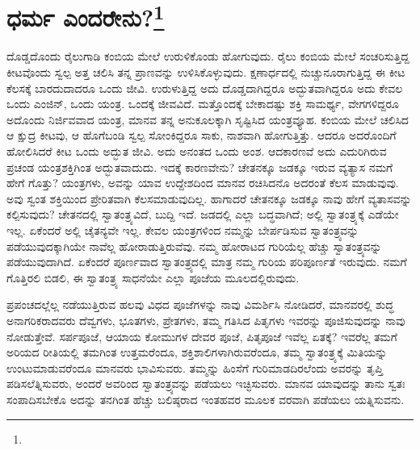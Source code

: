 
\chapter[ಧರ್ಮ ಎಂದರೇನು?]{ಧರ್ಮ ಎಂದರೇನು?\protect\footnote{}}

ದೊಡ್ಡದೊಂದು ರೈಲುಗಾಡಿ ಕಂಬಿಯ ಮೇಲೆ ಉರುಳಿಕೊಂಡು ಹೋಗುವುದು. ರೈಲು ಕಂಬಿಯ ಮೇಲೆ ಸಂಚರಿಸುತ್ತಿದ್ದ ಕೀಟವೊಂದು ಸ್ವಲ್ಪ ಅತ್ತ ಚಲಿಸಿ ತನ್ನ ಪ್ರಾಣವನ್ನು ಉಳಿಸಿಕೊಳ್ಳುವುದು. ಕ್ಷಣಾರ್ಧದಲ್ಲಿ ನುಚ್ಚುನೂರಾಗುತ್ತಿದ್ದ ಈ ಕೀಟ ಕೆಲಸಕ್ಕೆ ಬಾರದುದಾದರೂ ಒಂದು ಜೀವಿ. ಉರುಳುತ್ತಿದ್ದ ಅದು ದೊಡ್ಡದಾಗಿದ್ದರೂ ಅದ್ಭುತವಾಗಿದ್ದರೂ ಅದು ಕೇವಲ ಒಂದು ಎಂಜಿನ್, ಒಂದು ಯಂತ್ರ. ಒಂದಕ್ಕೆ ಜೀವವಿದೆ. ಮತ್ತೊಂದಕ್ಕೆ ಬೇಕಾದಷ್ಟು ಶಕ್ತಿ ಸಾಮರ್ಥ್ಯ, ವೇಗಗಳಿದ್ದರೂ ಅದೊಂದು ನಿರ್ಜಿವವಾದ ಯಂತ್ರ, ಮಾನವ ತನ್ನ ಅನುಕೂಲಕ್ಕಾಗಿ ಸೃಷ್ಟಿಸಿದ ಯಂತ್ರವ್ಯೂಹ. ಕಂಬಿಯ ಮೇಲೆ ಚಲಿಸಿದ ಆ ಕ್ಷುದ್ರ ಕೀಟವು, ಆ ಹೊಗೆಬಂಡಿ ಸ್ವಲ್ಪ ಸೋಂಕಿದ್ದರೂ ಸಾಕು, ನಾಶವಾಗಿ ಹೋಗುತ್ತಿತ್ತು. ಆದರೂ ಅದರೊಂದಿಗೆ ಹೋಲಿಸಿದರೆ ಕೀಟ ಒಂದು ಅದ್ಭುತ ಜೀವಿ. ಅದು ಅನಂತದ ಒಂದು ಅಂಶ. ಆದಕಾರಣವೆ ಅದು ಎದುರಿಗಿರುವ ಪ್ರಚಂಡ ಯಂತ್ರಶಕ್ತಿಗಿಂತ ಅದ್ಭುತವಾದುದು. ಇದಕ್ಕೆ ಕಾರಣವೇನು? ಚೇತನಕ್ಕೂ ಜಡಕ್ಕೂ ಇರುವ ವ್ಯತ್ಯಾಸ ನಮಗೆ ಹೇಗೆ ಗೊತ್ತು? ಯಂತ್ರಗಳು, ಅವನ್ನು ಯಾವ ಉದ್ದೇಶದಿಂದ ಮಾನವ ರಚಿಸಿದನೊ ಅದರಂತೆ ಕೆಲಸ ಮಾಡುವುವು. ಅವು ಸ್ವಂತ ಶಕ್ತಿಯಿಂದ ಪ್ರೇರಿತವಾಗಿ ಕೆಲಸಮಾಡುವುದಿಲ್ಲ. ಹಾಗಾದರೆ ಚೇತನಕ್ಕೂ ಜಡಕ್ಕೂ ನಾವು ಹೇಗೆ ವ್ಯತಾಸವನ್ನು ಕಲ್ಪಿಸುವುದು? ಚೇತನದಲ್ಲಿ ಸ್ವಾತಂತ್ರ್ಯವಿದೆ, ಬುದ್ದಿ ಇದೆ. ಜಡದಲ್ಲಿ ಎಲ್ಲಾ ಬದ್ಧವಾಗಿದೆ; ಅಲ್ಲಿ ಸ್ವಾತಂತ್ರ್ಯಕ್ಕೆ ಎಡೆಯೇ ಇಲ್ಲ. ಏಕೆಂದರೆ ಅಲ್ಲಿ ಚೈತನ್ಯವೇ ಇಲ್ಲ. ಕೇವಲ ಯಂತ್ರಗಳಿಂದ ನಮ್ಮನ್ನು ಬೇರ್ಪಡಿಸುವ ಸ್ವಾತಂತ್ರ್ಯವನ್ನು ಪಡೆಯುವುದಕ್ಕಾಗಿಯೇ ನಾವೆಲ್ಲ ಹೋರಾಡುತ್ತಿರುವೆವು. ನಮ್ಮ ಹೋರಾಟದ ಗುರಿಯೆಲ್ಲ ಹೆಚ್ಚು ಸ್ವಾತಂತ್ರ್ಯವನ್ನು ಪಡೆಯುವುದಾಗಿದೆ. ಏಕೆಂದರೆ ಪೂರ್ಣವಾದ ಸ್ವಾತಂತ್ರ್ಯದಲ್ಲಿ ಮಾತ್ರ ನಮ್ಮ ಗುರಿಯ ಪರಿಪೂರ್ಣತೆ ಇರುವುದು. ನಮಗೆ ಗೊತ್ತಿರಲಿ ಬಿಡಲಿ, ಈ ಸ್ವಾತಂತ್ರ್ಯ ಸಾಧನೆಯೇ ಎಲ್ಲಾ ಪೂಜೆಯ ಮೂಲದಲ್ಲಿರುವುದು.

ಪ್ರಪಂಚದಲ್ಲೆಲ್ಲ ನಡೆಯುತ್ತಿರುವ ಹಲವು ವಿಧದ ಪೂಜೆಗಳನ್ನು ನಾವು ವಿಮರ್ಶಿಸಿ ನೋಡಿದರೆ, ಮಾನವರಲ್ಲಿ ಶುದ್ಧ ಅನಾಗರಿಕರಾದವರು ದೆವ್ವಗಳು, ಭೂತಗಳು, ಪ್ರೇತಗಳು, ತಮ್ಮ ಗತಿಸಿದ ಪಿತೃಗಳು ಇವರನ್ನು ಪೂಜಿಸುವುದನ್ನು ನಾವು ನೋಡುತ್ತೇವೆ. ಸರ್ಪಪೂಜೆ, ಆಯಾಯ ಕೋಮುಗಳ ದೇವರ ಪೂಜೆ, ಪಿತೃಪೂಜೆ ಇವೆಲ್ಲ ಏತಕ್ಕೆ? ಇವರೆಲ್ಲ ತಮಗೆ ಅರಿಯದ ರೀತಿಯಲ್ಲಿ ತಮಗಿಂತ ಉತ್ತಮರೆಂದೂ, ಶಕ್ತಿಶಾಲಿಗಳಾಗಿರುವರೆಂದೂ, ತಮ್ಮ ಸ್ವಾತಂತ್ರ್ಯಕ್ಕೆ ಮಿತಿಯನ್ನು ಉಂಟುಮಾಡುವರೆಂದೂ ಮಾನವರು ಭಾವಿಸುವರು. ತಮ್ಮನ್ನು ಹಿಂಸೆಗೆ ಗುರಿಮಾಡದಿರಲೆಂದು ಅವರನ್ನು ತೃಪ್ತಿ ಪಡಿಸಲೆತ್ನಿಸುವರು, ಅಂದರೆ ಅವರಿಂದ ಸ್ವಾತಂತ್ರ್ಯವನ್ನು ಪಡೆಯಲು ಇಚ್ಛಿಸುವರು. ಮಾನವ ಯಾವುದನ್ನು ತಾನು ಸ್ವತಃ ಸಂಪಾದಿಸಬೇಕೊ ಅದನ್ನು ತನಗಿಂತ ಹೆಚ್ಚು ಬಲಿಷ್ಠರಾದ ಇಂತಹವರ ಮೂಲಕ ವರವಾಗಿ ಪಡೆಯಲು ಯತ್ನಿಸುವನು.

